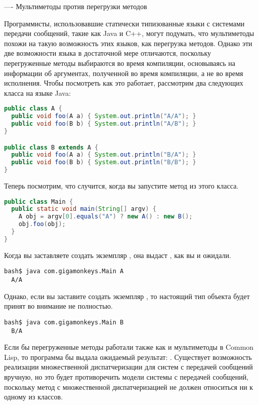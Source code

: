 ----
Мультиметоды против перегрузки методов

Программисты, использовавшие статически типизованные языки с системами передачи сообщений,
такие как Java и C++, могут подумать, что мультиметоды похожи на такую возможность этих
языков, как перегрузка методов.  Однако эти две возможности языка в достаточной мере
отличаются, поскольку перегруженные методы выбираются во время компиляции, основываясь на
информации об аргументах, полученной во время компиляции, а не во время исполнения.  Чтобы
посмотреть как это работает, рассмотрим два следующих класса на языке Java:

\begin{lstlisting}[language=java]
public class A {
  public void foo(A a) { System.out.println("A/A"); }
  public void foo(B b) { System.out.println("A/B"); }
}

public class B extends A {
  public void foo(A a) { System.out.println("B/A"); }
  public void foo(B b) { System.out.println("B/B"); }
}
\end{lstlisting}

Теперь посмотрим, что случится, когда вы запустите метод  из этого класса.

\begin{lstlisting}[language=java]
public class Main {
  public static void main(String[] argv) {
    A obj = argv[0].equals("A") ? new A() : new B();
    obj.foo(obj);
  }
}
\end{lstlisting}

Когда вы заставляете  создать экземпляр , она выдаст , как вы и
ожидали.

\begin{lstlisting}[style=lisprepl]
  bash$ java com.gigamonkeys.Main A
  A/A
\end{lstlisting}

Однако, если вы заставите  создать экземпляр , то настоящий тип объекта
 будет принят во внимание не полностью.

\begin{lstlisting}[style=lisprepl]
  bash$ java com.gigamonkeys.Main B
  B/A
\end{lstlisting}

Если бы перегруженные методы работали также как и мультиметоды в Common Lisp, то программа
бы выдала ожидаемый результат: .  Существует возможность реализации
множественной диспатчеризации для систем с передачей сообщений вручную, но это будет
противоречить модели системы с передачей сообщений, поскольку метод с множественной
диспатчеризацией не должен относиться ни к одному из классов.

